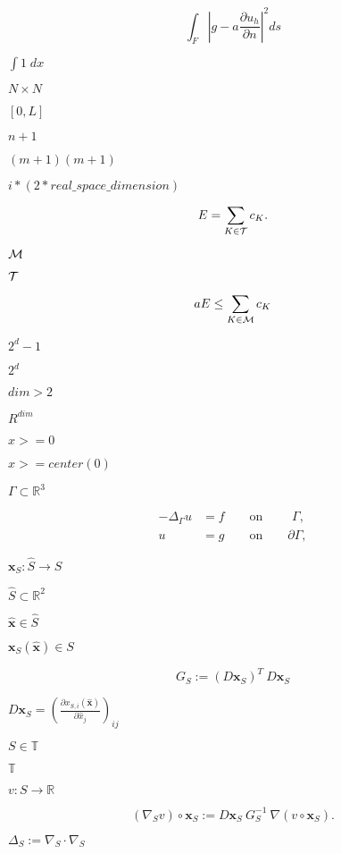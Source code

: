 \documentclass{article}
\begin{document}
\[ \int_F \left|g-a\frac{\partial u_h}{\partial n}\right|^2 ds \]
\pagebreak

$\int 1 \; dx$
\pagebreak

$N\times N$
\pagebreak

$[0,L]$
\pagebreak

$n+1$
\pagebreak

$(m+1)(m+1)$
\pagebreak

$i*(2*real\_space\_dimension)$
\pagebreak

\[ E = \sum_{K\in \cal T} c_K. \]
\pagebreak

$\cal M$
\pagebreak

$\cal T$
\pagebreak

\[ a E \le \sum_{K\in \cal M} c_K \]
\pagebreak

$2^d-1$
\pagebreak

$2^d$
\pagebreak

$dim>2$
\pagebreak

$R^{dim}$
\pagebreak

$x>=0$
\pagebreak

$x>=center(0)$
\pagebreak

$\Gamma \subset \mathbb R^3$
\pagebreak

\begin{align*} -\Delta_\Gamma u &= f \qquad \text{on } \qquad \Gamma,\\ u &= g \qquad \text{on} \qquad \partial \Gamma, \end{align*}
\pagebreak

$\mathbf x_S:\hat S \rightarrow S$
\pagebreak

$\hat S \subset \mathbb R^2$
\pagebreak

$\hat{\mathbf x}\in\hat S$
\pagebreak

${\mathbf x}_S(\hat{\mathbf x}) \in S$
\pagebreak

\[ G_S:= (D \mathbf{x}_S)^T \ D \mathbf{x}_S \]
\pagebreak

$D \mathbf{x}_S=\left(\frac{\partial x_{S,i}(\hat{\mathbf x})}{\partial \hat x_j}\right)_{ij}$
\pagebreak

$S \in {\mathbb T}$
\pagebreak

${\mathbb T}$
\pagebreak

$v : S \rightarrow \mathbb R$
\pagebreak

\[ (\nabla_S v)\circ \mathbf x_S := D \mathbf x_S \ G_S^{-1} \ \nabla (v \circ \mathbf x_S). \]
\pagebreak

$\Delta_S:= \nabla_S \cdot \nabla_S$
\pagebreak
\end{document}
